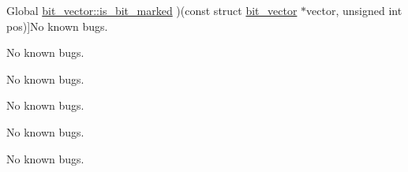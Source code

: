 \begin{DoxyRefList}
\hypertarget{bug__bug000112}{}%
\-Global \hyperlink{structbit__vector_ad8ffb52bc86612775cdca0d9d02dbf1a}{bit\-\_\-vector\-:\-:is\-\_\-bit\-\_\-marked} )(const struct \hyperlink{structbit__vector}{bit\-\_\-vector} $\ast$vector, unsigned int pos)]\-No known bugs.  
\item[\label{bug__bug000110}%
\hypertarget{bug__bug000110}{}%
\-Global \hyperlink{structbit__vector_afa480cad95d28f925a48ef49a26f83d8}{bit\-\_\-vector\-:\-:mark\-\_\-bit} )(struct \hyperlink{structbit__vector}{bit\-\_\-vector} $\ast$vector, unsigned int pos)]\-No known bugs.  
\item[\label{bug__bug000113}%
\hypertarget{bug__bug000113}{}%
\-Global \hyperlink{structbit__vector_a0cb7e47ff1bfefaf8e2cc0d5b4a361c3}{bit\-\_\-vector\-:\-:rank} )(const struct \hyperlink{structbit__vector}{bit\-\_\-vector} $\ast$vector, unsigned int start, unsigned int end)]\-No known bugs.  
\item[\label{bug__bug000111}%
\hypertarget{bug__bug000111}{}%
\-Global \hyperlink{structbit__vector_a63fceb0ab2c93f5d73f71bf156496716}{bit\-\_\-vector\-:\-:unmark\-\_\-bit} )(struct \hyperlink{structbit__vector}{bit\-\_\-vector} $\ast$vector, unsigned int pos)]\-No known bugs.  
\item[\label{bug__bug000069}%
\hypertarget{bug__bug000069}{}%
\-Global \hyperlink{bwt__to__s_8h_a8dc5f1f0c28a82783dd6065cfe71adba}{bwt\-\_\-to\-\_\-s} (const struct \hyperlink{structwavelet__tree}{wavelet\-\_\-tree} $\ast$bwt)]\-No known bugs.  
\item[\label{bug__bug000067}%
\hypertarget{bug__bug000067}{}%
\-File \hyperlink{bwt__to__s_8h}{bwt\-\_\-to\-\_\-s.h} ]\-No known bugs. 


\end{DoxyRefList}
